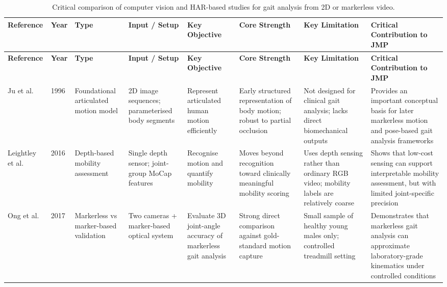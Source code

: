 \documentclass[12pt]{elsarticle}
\begin{document}
{\scriptsize
\setlength{\tabcolsep}{3pt}
\renewcommand{\arraystretch}{1.08}
\begin{longtable}{p{1.8cm} p{0.8cm} p{1.4cm} p{1.8cm} p{2.0cm} p{2.2cm} p{2.2cm} p{3.3cm}}
\caption{Critical comparison of computer vision and HAR-based studies for gait analysis from 2D or markerless video.}
\label{cv_har_gait_critical} \\
\hline
\textbf{Reference} & \textbf{Year} & \textbf{Type} & \textbf{Input / Setup} & \textbf{Key Objective} & \textbf{Core Strength} & \textbf{Key Limitation} & \textbf{Critical Contribution to JMP} \\
\hline
\endfirsthead

\hline
\textbf{Reference} & \textbf{Year} & \textbf{Type} & \textbf{Input / Setup} & \textbf{Key Objective} & \textbf{Core Strength} & \textbf{Key Limitation} & \textbf{Critical Contribution to JMP} \\
\hline
\endhead

Ju et al. \cite{ju1996cardboard}
& 1996
& Foundational articulated motion model
& 2D image sequences; parameterised body segments
& Represent articulated human motion efficiently
& Early structured representation of body motion; robust to partial occlusion
& Not designed for clinical gait analysis; lacks direct biomechanical outputs
& Provides an important conceptual basis for later markerless motion and pose-based gait analysis frameworks \\
\hline

Leightley et al. \cite{leightley2016automated}
& 2016
& Depth-based mobility assessment
& Single depth sensor; joint-group MoCap features
& Recognise motion and quantify mobility
& Moves beyond recognition toward clinically meaningful mobility scoring
& Uses depth sensing rather than ordinary RGB video; mobility labels are relatively coarse
& Shows that low-cost sensing can support interpretable mobility assessment, but with limited joint-specific precision \\
\hline

Ong et al. \cite{ong2017efficacy}
& 2017
& Markerless vs marker-based validation
& Two cameras + marker-based optical system
& Evaluate 3D joint-angle accuracy of markerless gait analysis
& Strong direct comparison against gold-standard motion capture
& Small sample of healthy young males only; controlled treadmill setting
& Demonstrates that markerless gait analysis can approximate laboratory-grade kinematics under controlled conditions \\
\hline


\end{longtable}}
\end{document}
